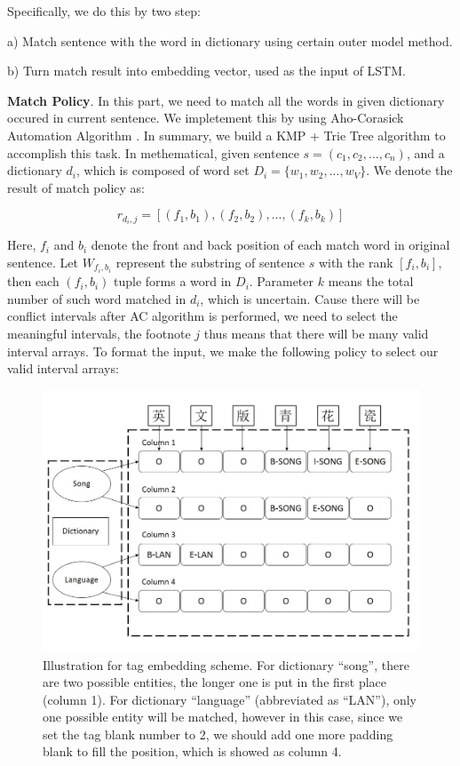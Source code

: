\documentclass[letterpaper]{article} %
\begin{document}
Specifically, we do this by two step: 

a)  Match sentence with the word in dictionary using certain outer model method.

b)  Turn match result into embedding vector, used as the input of LSTM.



\textbf{Match Policy}. In this part, we need to match all the words in given dictionary occured in current sentence. We impletement this by using Aho-Corasick Automation Algorithm \cite{acalg}. In summary, we build a KMP \cite{kmp} + Trie Tree \cite{trietree} algorithm to accomplish this task. In methematical, given sentence $s = (c_1, c_2, ..., c_n) $, and a dictionary $d_i$, which is composed of word set $D_i=\{w_1, w_2, ..., w_V\}$. We denote the result of match policy as:

\begin{equation}
r_{d_i, j} = [ (f_1, b_1), (f_2 , b_2), ..., (f_k, b_k) ] \label{match_result}
\end{equation}



Here, $f_i$ and $b_i$ denote the front and back position of each match word in original sentence. Let $W_{f_i,b_i}$ represent the substring of sentence $s$ with the rank $[f_i, b_i]$, then each $(f_i, b_i)$ tuple forms a word in $D_i$. Parameter $k$ means the total number of such word matched in $d_i$, which is uncertain. Cause there will be conflict intervals after AC algorithm is performed, we need to select the meaningful intervals, the footnote $j$ thus means that there will be many valid interval arrays. To format the input, we make the following policy to select our valid interval arrays:


\begin{figure}[t]
\centering
\includegraphics[width=0.9\columnwidth]{tag_scheme} %
\caption{Illustration for tag embedding scheme. For dictionary ``song'', there are two possible entities, the longer one is put in the first place (column 1). For dictionary ``language'' (abbreviated as ``LAN''), only one possible entity will be matched, however in this case, since we set the tag blank number to 2, we should add one more padding blank to fill the position, which is showed as column 4. }
\label{tag_scheme}
\end{figure}
\end{document}

